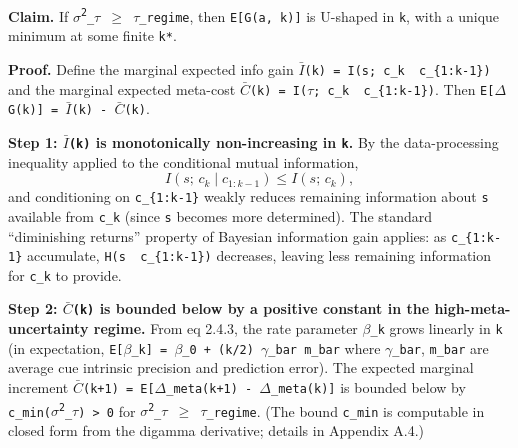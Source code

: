 \documentclass{article}
\begin{document}
\textbf{Claim.} If \texttt{\ensuremath{\sigma}\textsuperscript{2}\_\ensuremath{\tau}\ \ensuremath{\geq}\ \ensuremath{\tau}\_regime}, then
\texttt{E{[}G(a,\ k){]}} is U-shaped in \texttt{k}, with a unique
minimum at some finite \texttt{k*}.

\textbf{Proof.} Define the marginal expected info gain
\texttt{\ensuremath{\bar{I}}(k)\ =\ I(s;\ c\_k\ \textbar{}\ c\_\{1:k-1\})} and the marginal
expected meta-cost
\texttt{\ensuremath{\bar{C}}(k)\ =\ I(\ensuremath{\tau};\ c\_k\ \textbar{}\ c\_\{1:k-1\})}. Then
\texttt{E{[}\ensuremath{\Delta}G(k){]}\ =\ \ensuremath{\bar{I}}(k)\ -\ \ensuremath{\bar{C}}(k)}.

\textbf{Step 1: \texttt{\ensuremath{\bar{I}}(k)} is monotonically non-increasing in
\texttt{k}.} By the data-processing inequality applied to the
conditional mutual information, \[
I(s;\, c_k \mid c_{1:k-1}) \leq I(s;\, c_k),
\] and conditioning on \texttt{c\_\{1:k-1\}} weakly reduces remaining
information about \texttt{s} available from \texttt{c\_k} (since
\texttt{s} becomes more determined). The standard ``diminishing
returns'' property of Bayesian information gain applies: as
\texttt{c\_\{1:k-1\}} accumulate,
\texttt{H(s\ \textbar{}\ c\_\{1:k-1\})} decreases, leaving less
remaining information for \texttt{c\_k} to provide.

\textbf{Step 2: \texttt{\ensuremath{\bar{C}}(k)} is bounded below by a positive constant in
the high-meta-uncertainty regime.} From eq 2.4.3, the rate parameter
\texttt{\ensuremath{\beta}\_k} grows linearly in \texttt{k} (in expectation,
\texttt{E{[}\ensuremath{\beta}\_k{]}\ =\ \ensuremath{\beta}\_0\textquotesingle{}\ +\ (k/2)\ \ensuremath{\gamma}\_bar\ m\_bar}
where \texttt{\ensuremath{\gamma}\_bar}, \texttt{m\_bar} are average cue intrinsic
precision and prediction error). The expected marginal increment
\texttt{\ensuremath{\bar{C}}(k+1)\ =\ E{[}\ensuremath{\Delta}\_meta(k+1)\ -\ \ensuremath{\Delta}\_meta(k){]}} is bounded below
by \texttt{c\_min(\ensuremath{\sigma}\textsuperscript{2}\_\ensuremath{\tau})\ \textgreater{}\ 0} for
\texttt{\ensuremath{\sigma}\textsuperscript{2}\_\ensuremath{\tau}\ \ensuremath{\geq}\ \ensuremath{\tau}\_regime}. (The bound \texttt{c\_min} is computable
in closed form from the digamma derivative; details in Appendix A.4.)
\end{document}
